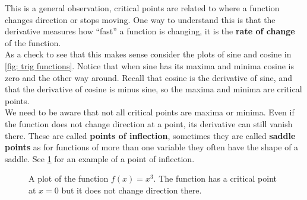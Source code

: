 This is a general observation, critical points are related to where a function changes direction or stops moving. One way to understand this is that the derivative measures how ``fast'' a function is changing, it is the \textbf{rate of change} of the function. \\

As a check to see that this makes sense consider the plots of sine and cosine in \cref{fig: trig functions}. Notice that when sine has its maxima and minima cosine is zero and the other way around. Recall that cosine is the derivative of sine, and that the derivative of cosine is minus sine, so the maxima and minima are critical points.\\

We need to be aware that not all critical points are maxima or minima. Even if the function does not change direction at a point, its derivative can still vanish there. These are called \textbf{points of inflection}, sometimes they are called \textbf{saddle points} as for functions of more than one variable they often have the shape of a saddle. See \cref{fig: crit points 2} for an example of a point of inflection.\\

\begin{figure}[ht]
    \centering
{}
    \caption{A plot of the function $f(x)=x^{3}$. The function has a critical point at $x=0$ but it does not change direction there. }
        \label{fig: crit points 2}
\end{figure}

